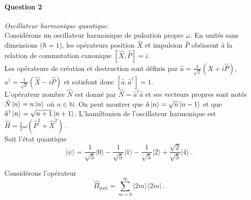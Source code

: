 \paragraph{Question 2} \textit{Oscillateur harmonique quantique.} \\

Considérons un oscillateur harmonique de pulsation propre $\omega$. En unités sans dimensions ($\hbar=1$), les opérateurs position $\hat X$ et impulsion $\hat P$ obéissent à la relation de commutation canonique $[\hat X, \hat P]=i $. \\

Les opérateurs de création et destruction sont définis par 
$\hat a= \frac{1}{\sqrt{2}}(\hat X+i\hat P)$, $a^\dagger= \frac{1}{\sqrt{2}}(\hat X-i\hat P)$ et satisfont donc $[\hat a,\hat a^\dagger]=1$. \\

L'opérateur nombre $\hat N$ est donné par $\hat N= \hat a^\dagger \hat a$ et ses vecteurs propres sont notés $\hat N \ket{n} =n \ket{n}$ où $n \in \mathbb{N}$. On peut montrer que $\hat a \ket{n} =\sqrt{n} \ket{n-1}$ et que $\hat a^\dagger \ket{n} =\sqrt{n+1} \ket{n+1}$. L'hamiltonien de l'oscillateur harmonique est $\hat H = \frac{1}{2}\omega ( \hat P^2 + \hat X^2 )\ $. \\

Soit l'état quantique 
\begin{equation}
\vert \psi \rangle = 
 \frac{1}{\sqrt{5}}\vert 0\rangle -  \frac{1}{\sqrt{5}}\vert 1\rangle  - \frac{1}{\sqrt{5}}\vert 2\rangle + \frac{\sqrt{2}}{\sqrt{5}}\vert 4\rangle \ .
 \label{Eq:psi}
\end{equation}

Considérons l'opérateur
\begin{equation}
\hat \Pi_{\text{pair}}=\sum_{m=0}^\infty \vert 2m \rangle \langle 2m \vert \ .
\end{equation}


